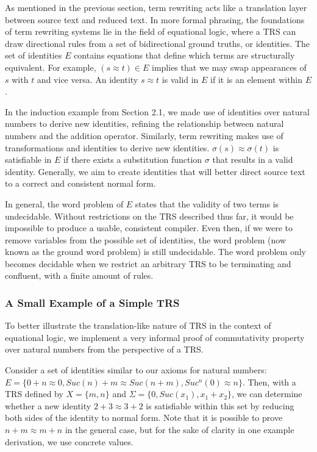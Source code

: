 \documentclass{article}
\begin{document}
As mentioned in the previous section, term rewriting acts like a translation layer between source text and reduced text.
In more formal phrasing, the foundations of term rewriting systems lie in the field of equational logic,
where a TRS can draw directional rules from a set of bidirectional ground truths, or identities. The set of identities $E$
contains equations that define which terms are structurally equivalent. For example, $(s \approx t) \in E$ implies that
we may swap appearances of $s$ with $t$ and vice versa. An identity $s \approx t$ is valid in $E$ if it is an element within $E$.

In the induction example from Section 2.1,
we made use of identities over natural numbers to derive new identities, refining the relationship between natural numbers and the addition operator.
Similarly, term rewriting makes use of transformations and identities to derive new identities. $\sigma(s) \approx \sigma(t)$ is satisfiable in $E$ if
there exists a substitution function $\sigma$ that results in a valid identity. Generally, we aim to create identities that will better direct source text
to a correct and consistent normal form.

In general, the word problem of $E$ states that the validity of two terms is undecidable.
Without restrictions on the TRS described thus far,
it would be impossible to produce a usable, consistent compiler.
Even then, if we were to remove variables from the possible set of identities,
the word problem (now known as the ground word problem) is still undecidable.
The word problem only becomes decidable when we restrict an arbitrary TRS to be terminating and confluent, with a finite amount of rules.


\subsubsection{A Small Example of a Simple TRS}

To better illustrate the translation-like nature of TRS in the context of equational logic, we implement a very informal proof of commutativity property
over natural numbers from the perspective of a TRS.

Consider a set of identities similar to our axioms for natural numbers:
$E = \{0 + n \approx 0, Suc(n) + m \approx Suc(n + m), Suc^n(0) \approx n\}$.
Then, with a TRS defined by $X = \{m,n\}$ and $\Sigma = \{0, Suc(x_1), x_1 + x_2\}$,
we can determine whether a new identity $2 + 3 \approx 3 + 2$
is satisfiable within this set by reducing both sides of the identity to normal form.
Note that it is possible to prove $n + m \approx m + n$ in the general case, but for the sake of clarity in one example derivation,
we use concrete values.
\end{document}
